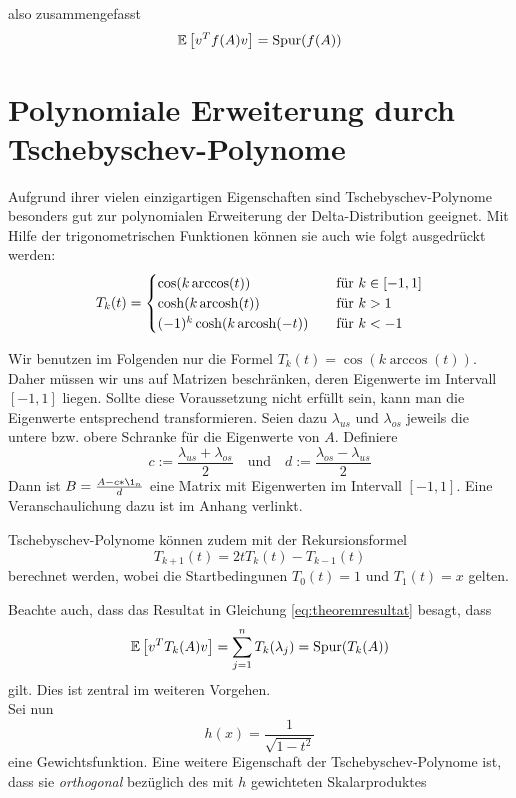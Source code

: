 also zusammengefasst
\begin{equation} \label{eq:theoremresultat}
    \mathbb{E}\left[v^Tf(A)v\right] = \operatorname{Spur}(f(A))
\end{equation}

\section{Polynomiale Erweiterung durch Tschebyschev-Polynome}
Aufgrund ihrer vielen einzigartigen Eigenschaften sind Tschebyschev-Polynome besonders gut zur polynomialen Erweiterung der Delta-Distribution geeignet.
Mit Hilfe der trigonometrischen Funktionen können sie auch wie folgt ausgedrückt werden:
\[ T_k(t) =
\begin{cases}
    \cos(k \arccos(t))            & \quad \text{für } k \in [-1, 1]\\
    \cosh(k \operatorname{arcosh}(t))           & \quad \text{für } k > 1\\
    (-1)^k \cosh(k \operatorname{arcosh}(-t))   & \quad \text{für } k < -1
\end{cases}
\]

Wir benutzen im Folgenden nur die Formel $T_k(t) = \cos(k \arccos(t))$.
Daher müssen wir uns auf Matrizen beschränken, deren Eigenwerte im Intervall $[-1, 1]$ liegen.
Sollte diese Voraussetzung nicht erfüllt sein, kann man die Eigenwerte entsprechend transformieren.
Seien dazu $\lambda_{us}$ und $\lambda_{os}$ jeweils die untere bzw. obere Schranke für die Eigenwerte von $A$.
Definiere
$$c := \frac{\lambda_{us} + \lambda_{os}}{2} \quad \text{und} \quad d := \frac{\lambda_{os} - \lambda_{us}}{2}$$
Dann ist $B = \frac{A - c*\1_n}{d}$ eine Matrix mit Eigenwerten im Intervall $[-1, 1]$.
Eine Veranschaulichung dazu ist im Anhang verlinkt.

Tschebyschev-Polynome können zudem mit der Rekursionsformel
$$T_{k + 1}(t) = 2tT_k(t) - T_{k - 1}(t)$$
berechnet werden, wobei die Startbedingunen $T_0(t) = 1$ und $T_1(t) = x$ gelten.

Beachte auch, dass das Resultat in Gleichung \ref{eq:theoremresultat} besagt, dass
\begin{equation} \label{eq:Tschebyschev-Spur}
    \mathbb{E}\left[v^TT_k(A)v\right] = \sum_{j = 1}^n T_k(\lambda_j) = \operatorname{Spur}(T_k(A))
\end{equation}
gilt. Dies ist zentral im weiteren Vorgehen.\\

Sei nun
\begin{equation} \label{eq:Gewichtsfunktion}
    h(x) = \frac{1}{\sqrt{1 - t^2}}
\end{equation}
eine Gewichtsfunktion.
Eine weitere Eigenschaft der Tschebyschev-Polynome ist, dass sie \emph{orthogonal} bezüglich des mit $h$ gewichteten Skalarproduktes

